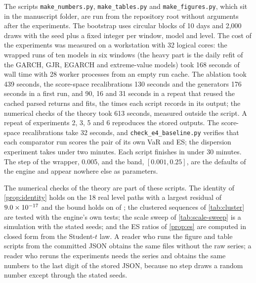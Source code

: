 \endgroup
The scripts \texttt{make\_numbers.py}, \texttt{make\_tables.py} and \texttt{make\_figures.py}, which sit in the manuscript folder, are run from the repository root without arguments after the experiments.
The bootstrap uses circular blocks of 10 days and 2,000 draws with the seed \seedBase{} plus a fixed integer per window, model and level. The cost of the experiments was measured on a workstation with 32 logical cores: the wrapped runs of ten models in six windows (the heavy part is the daily refit of the GARCH, GJR, EGARCH and extreme-value models) took 168 seconds of wall time with 28 worker processes from an empty run cache. The ablation took 439 seconds, the score-space recalibrations 130 seconds and the generators 176 seconds in a first run, and 90, 16 and 31 seconds in a repeat that reused the cached parsed returns and fits, the times each script records in its output; the numerical checks of the theory took 613 seconds, measured outside the script. A repeat of experiments 2, 3, 5 and 6 reproduces the stored outputs. The score-space recalibrations take 32 seconds, and \texttt{check\_e4\_baseline.py} verifies that each comparator run scores the pair of its own VaR and ES; the dispersion experiment takes under two minutes. Each script finishes in under 30 minutes. The step of the wrapper, 0.005, and the band, $[0.001, 0.25]$, are the defaults of the engine and appear nowhere else as parameters.

The numerical checks of the theory are part of these scripts. The identity of \cref{prop:identity} holds on the 18 real level paths with a largest residual of $9.0\times 10^{-17}$ and the bound holds on \thAHold{} of \thA{}; the clustered sequences of \cref{tab:cluster} are tested with the engine's own tests; the scale sweep of \cref{tab:scale-sweep} is a simulation with the stated seeds; and the ES ratios of \cref{prop:es} are computed in closed form from the Student-$t$ law. A reader who runs the figure and table scripts from the committed JSON obtains the same files without the raw series; a reader who reruns the experiments needs the series and obtains the same numbers to the last digit of the stored JSON, because no step draws a random number except through the stated seeds.
